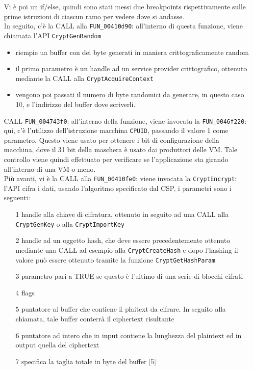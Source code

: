 \documentclass[12pt]{extarticle}
\begin{document}
Vi è poi un if/else, quindi sono stati messi due breakpoints rispettivamente sulle prime istruzioni di ciascun ramo per vedere dove si andasse.\\In seguito, c'è la CALL alla \texttt{FUN\_00410d90}: all'interno di questa funzione, viene chiamata l'API \texttt{CryptGenRandom}
\begin{itemize}
    \item riempie un buffer con dei byte generati in maniera crittograficamente random
    \item il primo parametro è un handle ad un service provider crittografico, ottenuto mediante la CALL alla \texttt{CryptAcquireContext}
    \item vengono poi passati il numero di byte randomici da generare, in questo caso 10, e l'indirizzo del buffer dove scriverli.
\end{itemize}
CALL \texttt{FUN\_004743f0}: all'interno della funzione, viene invocata la \texttt{FUN\_0046f220}: qui, c'è l'utilizzo dell'istruzione macchina \texttt{CPUID}, passando il valore 1 come parametro. Questo viene usato per ottenere i bit di configurazione della macchina, dove il 31 bit della maschera è usato dai produttori delle VM. Tale controllo viene quindi effettuato per verificare se l'applicazione sta girando all'interno di una VM o meno.\\Più avanti, vi è la CALL alla \texttt{FUN\_00410fe0}: viene invocata la \texttt{CryptEncrypt}: l'API cifra i dati, usando l'algoritmo specificato dal CSP, i parametri sono i seguenti:
\begin{itemize}
    \item[1] handle alla chiave di cifratura, ottenuto in seguito ad una CALL alla \texttt{CryptGenKey} o alla \texttt{CryptImportKey}
    \item[2] handle ad un oggetto hash, che deve essere precedentemente ottenuto mediante una CALL ad esempio alla \texttt{CryptCreateHash} e dopo l'hashing il valore può essere ottenuto tramite la funzione \texttt{CryptGetHashParam}
    \item[3] parametro pari a TRUE se questo è l'ultimo di una serie di blocchi cifrati
    \item[4] flags
    \item[5] puntatore al buffer che contiene il plaitext da cifrare. In seguito alla chiamata, tale buffer conterrà il ciphertext risultante
    \item[6] puntatore ad intero che in input contiene la lunghezza del plaintext ed in output quella del ciphertext
    \item[7] specifica la taglia totale in byte del buffer [5]
\end{itemize}
\end{document}
